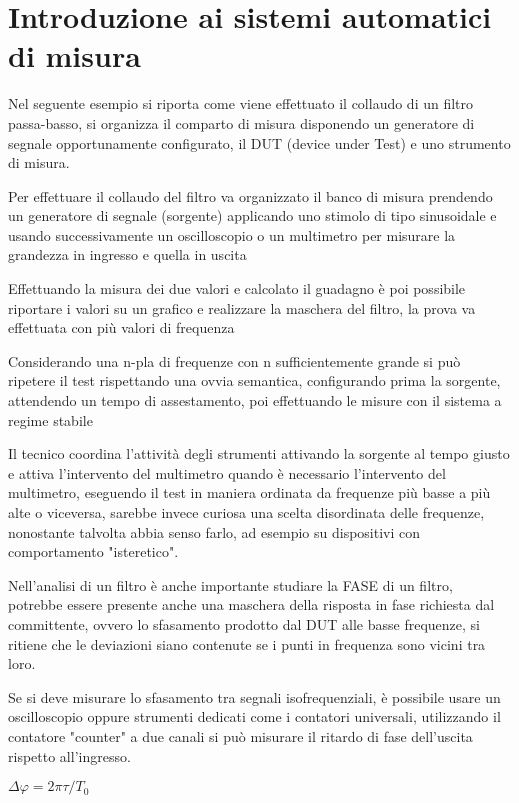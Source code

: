 \chapter{Introduzione ai sistemi automatici di misura}
Nel seguente esempio si riporta come viene effettuato il collaudo di un filtro
passa-basso, si organizza il comparto di misura disponendo un generatore di
segnale opportunamente configurato, il DUT (device under Test) e uno strumento
di misura.

Per effettuare il collaudo del filtro va organizzato il banco di misura
prendendo un generatore di
segnale (sorgente)
applicando uno stimolo di tipo sinusoidale e usando successivamente un
oscilloscopio o un multimetro
per misurare la grandezza
in ingresso e quella in uscita

Effettuando la misura dei due valori e calcolato il guadagno è poi possibile
riportare i valori su
un grafico e realizzare la maschera del filtro, la prova va effettuata con più
valori di frequenza

Considerando una n-pla di frequenze con n sufficientemente grande si può
ripetere il test
rispettando una ovvia semantica, configurando prima la sorgente, attendendo un
tempo di
assestamento, poi effettuando le misure con il sistema a regime stabile

Il tecnico coordina l'attività degli strumenti attivando la sorgente al tempo
giusto e attiva
l'intervento del multimetro quando è necessario l'intervento del multimetro,
eseguendo il test in
maniera ordinata da frequenze più basse a più alte o viceversa, sarebbe invece
curiosa una scelta
disordinata delle frequenze, nonostante talvolta abbia senso farlo, ad esempio
su dispositivi con
comportamento "isteretico".

Nell'analisi di un filtro è anche importante studiare la FASE di un filtro,
potrebbe essere
presente anche una maschera della risposta in fase richiesta dal committente,
ovvero lo sfasamento
prodotto dal DUT alle basse frequenze, si ritiene che le deviazioni siano
contenute se i punti in
frequenza sono vicini tra loro.

Se si deve misurare lo sfasamento tra segnali isofrequenziali, è possibile usare
un oscilloscopio
oppure strumenti dedicati come i contatori universali, utilizzando il contatore
"counter" a due
canali si può misurare il ritardo di fase dell'uscita rispetto all'ingresso.


$\Delta\varphi = 2\pi \tau / T_0$

